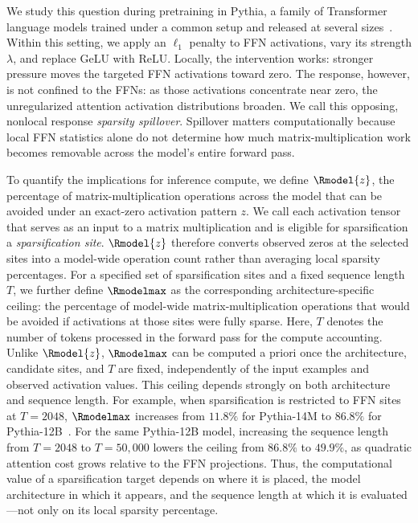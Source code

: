 We study this question during pretraining in Pythia, a family of Transformer language models trained under a common setup and released at several sizes~\cite{biderman2023pythia}. Within this setting, we apply an \(\ell_1\) penalty to FFN activations, vary its strength \(\lambda\), and replace GeLU with ReLU. Locally, the intervention works: stronger pressure moves the targeted FFN activations toward zero. The response, however, is not confined to the FFNs: as those activations concentrate near zero, the unregularized attention activation distributions broaden. We call this opposing, nonlocal response \emph{sparsity spillover}. Spillover matters computationally because local FFN statistics alone do not determine how much matrix-multiplication work becomes removable across the model's entire forward pass.

To quantify the implications for inference compute, we define \(\Rmodel{z}\), the percentage of matrix-multiplication operations across the model that can be avoided under an exact-zero activation pattern \(z\). We call each activation tensor that serves as an input to a matrix multiplication and is eligible for sparsification a \emph{sparsification site}. \(\Rmodel{z}\) therefore converts observed zeros at the selected sites into a model-wide operation count rather than averaging local sparsity percentages. For a specified set of sparsification sites and a fixed sequence length \(T\), we further define \(\Rmodelmax\) as the corresponding architecture-specific ceiling: the percentage of model-wide matrix-multiplication operations that would be avoided if activations at those sites were fully sparse. Here, \(T\) denotes the number of tokens processed in the forward pass for the compute accounting. Unlike \(\Rmodel{z}\), \(\Rmodelmax\) can be computed a priori once the architecture, candidate sites, and \(T\) are fixed, independently of the input examples and observed activation values. This ceiling depends strongly on both architecture and sequence length. For example, when sparsification is restricted to FFN sites at \(T=2048\), \(\Rmodelmax\) increases from \(11.8\%\) for Pythia-14M to \(86.8\%\) for Pythia-12B~\cite{biderman2023pythia}. For the same Pythia-12B model, increasing the sequence length from \(T=2048\) to \(T=50{,}000\) lowers the ceiling from \(86.8\%\) to \(49.9\%\), as quadratic attention cost grows relative to the FFN projections. Thus, the computational value of a sparsification target depends on where it is placed, the model architecture in which it appears, and the sequence length at which it is evaluated---not only on its local sparsity percentage.

